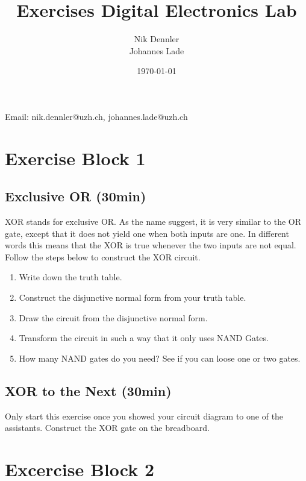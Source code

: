 \documentclass[10pt,a4paper]{article}
\author{Nik Dennler \\ Johannes Lade}
\title{Exercises Digital Electronics Lab}
\date{\today{}}
\begin{document}
	
\begin{titlepage}
	\maketitle
		\begin{center}
			Email: nik.dennler@uzh.ch, johannes.lade@uzh.ch
		\end{center}
	\thispagestyle{empty}
\end{titlepage}




\section{Exercise Block 1}
\label{sec:exercise-block-1}

\subsection{Exclusive OR (30min)}\label{subsec:ex-1}

XOR stands for exclusive OR. As the name suggest, it is very similar to the OR gate, except that it does not yield one when both inputs are one. In different words this means that the XOR is true whenever the two inputs are not equal. Follow the steps below to construct the XOR circuit.
\begin{enumerate}
	\item Write down the truth table.
	\item\label{it:1} Construct the disjunctive normal form from your truth table.
	\item Draw the circuit from the disjunctive normal form.
	\item Transform the circuit in such a way that it only uses NAND Gates.
	\item How many NAND gates do you need? See if you can loose one or two gates.
\end{enumerate}

\subsection{XOR to the Next (30min)}
Only start this exercise once you showed your circuit diagram to one of the assistants.
Construct the XOR gate on the breadboard.

\section{Excercise Block 2}
\end{document}
